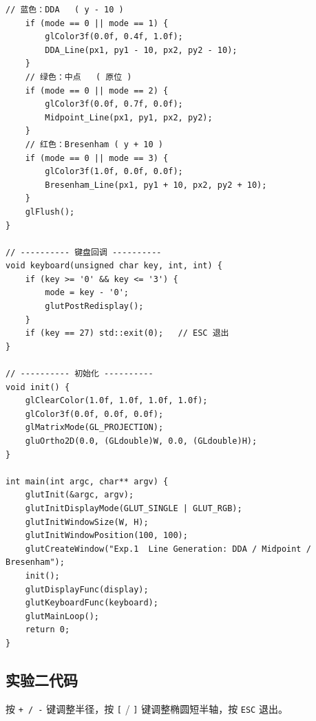 \documentclass[a4paper,12pt]{ctexart}
\begin{document}
\begin{lstlisting}[style=cppstyle,caption={直线生成算法对比 —— 完整源代码}]
    // 蓝色：DDA   ( y - 10 )
    if (mode == 0 || mode == 1) {
        glColor3f(0.0f, 0.4f, 1.0f);
        DDA_Line(px1, py1 - 10, px2, py2 - 10);
    }
    // 绿色：中点   ( 原位 )
    if (mode == 0 || mode == 2) {
        glColor3f(0.0f, 0.7f, 0.0f);
        Midpoint_Line(px1, py1, px2, py2);
    }
    // 红色：Bresenham ( y + 10 )
    if (mode == 0 || mode == 3) {
        glColor3f(1.0f, 0.0f, 0.0f);
        Bresenham_Line(px1, py1 + 10, px2, py2 + 10);
    }
    glFlush();
}

// ---------- 键盘回调 ----------
void keyboard(unsigned char key, int, int) {
    if (key >= '0' && key <= '3') {
        mode = key - '0';
        glutPostRedisplay();
    }
    if (key == 27) std::exit(0);   // ESC 退出
}

// ---------- 初始化 ----------
void init() {
    glClearColor(1.0f, 1.0f, 1.0f, 1.0f);
    glColor3f(0.0f, 0.0f, 0.0f);
    glMatrixMode(GL_PROJECTION);
    gluOrtho2D(0.0, (GLdouble)W, 0.0, (GLdouble)H);
}

int main(int argc, char** argv) {
    glutInit(&argc, argv);
    glutInitDisplayMode(GLUT_SINGLE | GLUT_RGB);
    glutInitWindowSize(W, H);
    glutInitWindowPosition(100, 100);
    glutCreateWindow("Exp.1  Line Generation: DDA / Midpoint / Bresenham");
    init();
    glutDisplayFunc(display);
    glutKeyboardFunc(keyboard);
    glutMainLoop();
    return 0;
}
\end{lstlisting}

\subsection{实验二代码}

按 \texttt{+ / -} 键调整半径，按 \texttt{[} / \texttt{]} 键调整椭圆短半轴，按 \texttt{ESC} 退出。
\end{document}

